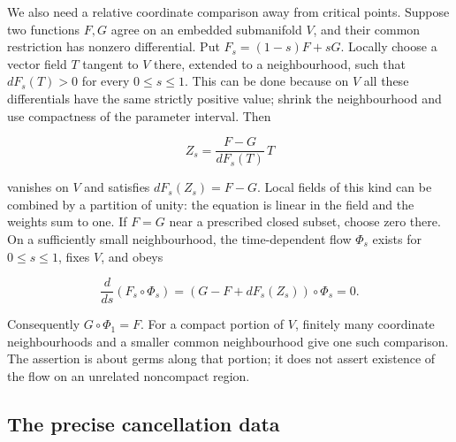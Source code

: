 We also need a relative coordinate comparison away from critical points. Suppose two functions \(F,G\) agree on an embedded submanifold \(V\), and their common restriction has nonzero differential. Put \(F_s=(1-s)F+sG\). Locally choose a vector field \(T\) tangent to \(V\) there, extended to a neighbourhood, such that \(dF_s(T)>0\) for every \(0\leq s\leq1\). This can be done because on \(V\) all these differentials have the same strictly positive value; shrink the neighbourhood and use compactness of the parameter interval. Then

\begin{equation}
Z_s=\frac{F-G}{dF_s(T)}\,T
\label{courseIII:morse-cancellation-with-controlled-support:eq:1.5}
\end{equation}

vanishes on \(V\) and satisfies \(dF_s(Z_s)=F-G\). Local fields of this kind can be combined by a partition of unity: the equation is linear in the field and the weights sum to one. If \(F=G\) near a prescribed closed subset, choose zero there. On a sufficiently small neighbourhood, the time-dependent flow \(\Phi_s\) exists for \(0\leq s\leq1\), fixes \(V\), and obeys

\begin{equation}
\frac{d}{ds}(F_s\circ\Phi_s)
=(G-F+dF_s(Z_s))\circ\Phi_s=0.
\label{courseIII:morse-cancellation-with-controlled-support:eq:1.6}
\end{equation}

Consequently \(G\circ\Phi_1=F\). For a compact portion of \(V\), finitely many coordinate neighbourhoods and a smaller common neighbourhood give one such comparison. The assertion is about germs along that portion; it does not assert existence of the flow on an unrelated noncompact region.

\subsection{The precise cancellation data}
\label{courseIII:morse-cancellation-with-controlled-support:morse-cancellation-data}

\label{courseIII:morse-cancellation-with-controlled-support:section-2}\label{courseIII:morse-cancel:2.1}

